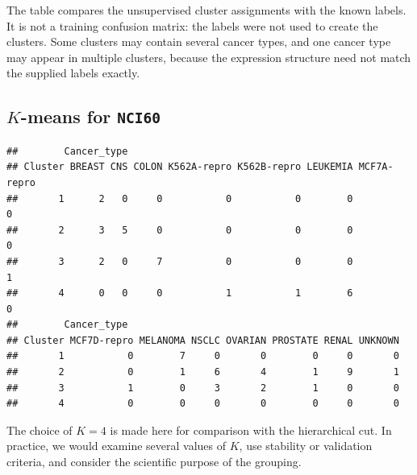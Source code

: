 \documentclass[
  11pt,
]{article}
\newenvironment{Shaded}{\begin{snugshade}}{\end{snugshade}}
\newcommand{\AttributeTok}[1]{\textcolor[rgb]{0.13,0.29,0.53}{#1}}
\newcommand{\DecValTok}[1]{\textcolor[rgb]{0.00,0.00,0.81}{#1}}
\newcommand{\FunctionTok}[1]{\textcolor[rgb]{0.13,0.29,0.53}{\textbf{#1}}}
\newcommand{\NormalTok}[1]{#1}
\newcommand{\OtherTok}[1]{\textcolor[rgb]{0.56,0.35,0.01}{#1}}
\newcommand{\SpecialCharTok}[1]{\textcolor[rgb]{0.81,0.36,0.00}{\textbf{#1}}}
\begin{document}
The table compares the unsupervised cluster assignments with the known
labels. It is not a training confusion matrix: the labels were not used
to create the clusters. Some clusters may contain several cancer types,
and one cancer type may appear in multiple clusters, because the
expression structure need not match the supplied labels exactly.

\subsection{\texorpdfstring{\(K\)-means for
\texttt{NCI60}}{K-means for NCI60}}\label{k-means-for-nci60}

\begin{Shaded}
\end{Shaded}

\begin{verbatim}
##        Cancer_type
## Cluster BREAST CNS COLON K562A-repro K562B-repro LEUKEMIA MCF7A-repro
##       1      2   0     0           0           0        0           0
##       2      3   5     0           0           0        0           0
##       3      2   0     7           0           0        0           1
##       4      0   0     0           1           1        6           0
##        Cancer_type
## Cluster MCF7D-repro MELANOMA NSCLC OVARIAN PROSTATE RENAL UNKNOWN
##       1           0        7     0       0        0     0       0
##       2           0        1     6       4        1     9       1
##       3           1        0     3       2        1     0       0
##       4           0        0     0       0        0     0       0
\end{verbatim}

The choice of \(K=4\) is made here for comparison with the hierarchical
cut. In practice, we would examine several values of \(K\), use
stability or validation criteria, and consider the scientific purpose of
the grouping.
\end{document}
